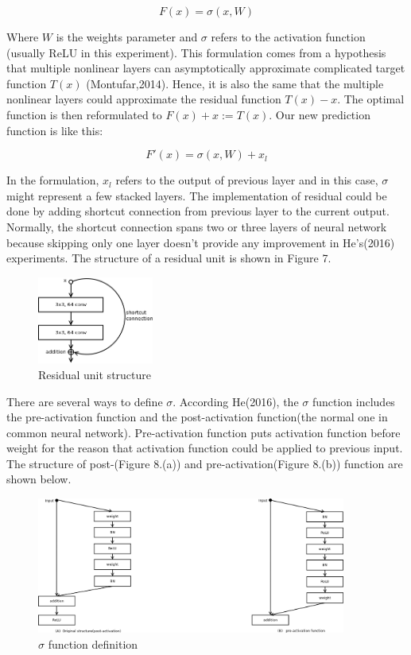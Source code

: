 \documentclass[]{article}
\begin{document}
\begin{equation}
	F(x) = \sigma(x,W)
\end{equation}

Where $W$ is the weights parameter and $\sigma$ refers to the activation function (usually ReLU in this experiment). This formulation comes from a hypothesis that multiple nonlinear layers can asymptotically approximate complicated target function $T(x)$  (Montufar,2014). Hence, it is also the same that the multiple nonlinear layers could approximate the residual function $T(x)-x$. The optimal function is then reformulated to $F(x) + x := T(x)$. Our new prediction function is like this:

\begin{equation}
	F'(x) = \sigma(x,W) + x_l
\end{equation}

In the formulation, $x_l$ refers to the output of previous layer and in this case, $\sigma$ might represent a few stacked layers.  The implementation of residual could be done by adding shortcut connection from previous layer to the current output. Normally, the shortcut connection spans two or three layers of neural network because skipping only one layer doesn't provide any improvement in He's(2016) experiments. The structure of a residual unit is shown in Figure 7.

\begin{figure}[!h]
\begin{center}
\includegraphics[width = 1.5in]{residualunit}
\caption{Residual unit structure}
\end{center}
\end{figure}

There are several ways to define $\sigma$. According He(2016), the $\sigma$ function includes the pre-activation function and the post-activation function(the normal one in common neural network). Pre-activation function puts activation function before weight for the reason that activation function could be applied to previous input. The structure of post-(Figure 8.(a)) and pre-activation(Figure 8.(b)) function are shown below.

\begin{figure}[!h]
\begin{center}
\includegraphics[width = 4in]{res_activation_function}
\caption{$\sigma$ function definition}
\end{center}
\end{figure}
\end{document}
